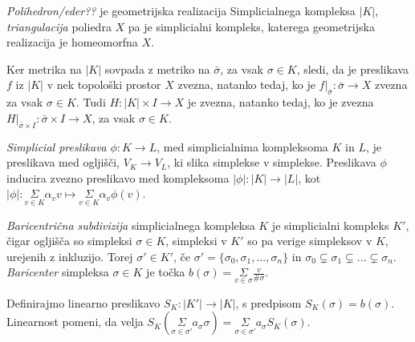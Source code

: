\documentclass[a4paper,12pt]{article}
\DeclareRobustCommand{\si}{
    \bar{\sigma}
}
\theoremstyle{definition}
\theoremstyle{plain}
\theoremstyle{plain}
\theoremstyle{definition}
\theoremstyle{plain}
\theoremstyle{plain}
\begin{document}
\textit{Polihedron/eder??} je geometrijska realizacija Simplicialnega kompleksa $|K|$, \textit{triangulacija} poliedra $X$ pa je simplicialni kompleks, katerega geometrijska realizacija je homeomorfna $X$.

Ker metrika na $|K|$ sovpada z metriko na $\bar{\sigma}$, za vsak $\sigma\in K$, sledi, da je preslikava $f$ iz $|K|$ v nek topološki prostor $X$ zvezna, natanko tedaj, ko je $f|_{\bar{\sigma}}: \bar{\sigma} \rightarrow X$ zvezna za vsak $\sigma\in K$. Tudi $H:|K|\times I \rightarrow X$ je zvezna, natanko tedaj, ko je zvezna $H|_{\si\times I}:\si\times I \rightarrow X$, za vsak $\sigma\in K$.


\textit{Simplicial preslikava} $\phi :K \rightarrow L$, med 
simplicialnima kompleksoma $K$ in $L$, je preslikava med 
ogljišči, $V_K \rightarrow V_L$, ki slika simplekse v 
simplekse. Preslikava $\phi$ inducira zvezno preslikavo med 
kompleksoma $|\phi| :|K| \rightarrow |L|$, kot $|\phi|:
\underset{v \in K}{\Sigma}\alpha_v v \mapsto
\underset{v \in K}{\Sigma}\alpha_v \phi(v)$.

    
\textit{Baricentrična subdivizija} simplicialnega kompleksa 
$K$ je simplicialni kompleks $K'$, čigar ogljišča so 
simpleksi $\sigma \in K$, simpleksi v $K'$ so pa verige 
simpleksov v $K$, urejenih z inkluzijo. Torej $\sigma' \in K'$, če $\sigma' = \{\sigma_0, \sigma_1,...,\sigma_n\}$ in $\sigma_0\subsetneq \sigma_1\subsetneq...\subsetneq\sigma_n$. \textit{Baricenter} simpleksa $\sigma \in K$ je točka $b(\sigma)=\underset{v\in \sigma}{\Sigma} \frac{v}{\#\sigma}$.

Definirajmo linearno preslikavo $S_K: |K'| \rightarrow |K|$, s predpisom $S_K(\sigma) = b(\sigma)$. Linearnost pomeni, da velja $S_K(\underset{\sigma\in \sigma'}{\Sigma} a_\sigma \sigma) =  \underset{\sigma\in \sigma'}{\Sigma} a_\sigma S_K(\sigma).$
\end{document}
